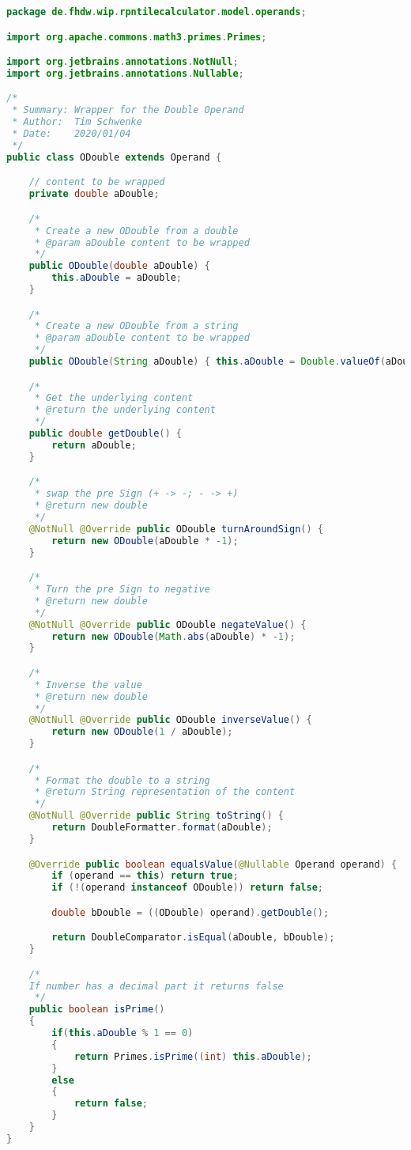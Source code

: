 \begin{lstlisting}[caption=ODouble (Schwenke),label=list:ODouble,language=Java]
package de.fhdw.wip.rpntilecalculator.model.operands;

import org.apache.commons.math3.primes.Primes;

import org.jetbrains.annotations.NotNull;
import org.jetbrains.annotations.Nullable;

/*
 * Summary: Wrapper for the Double Operand
 * Author:  Tim Schwenke
 * Date:    2020/01/04
 */
public class ODouble extends Operand {

    // content to be wrapped
    private double aDouble;

    /*
     * Create a new ODouble from a double
     * @param aDouble content to be wrapped
     */
    public ODouble(double aDouble) {
        this.aDouble = aDouble;
    }

    /*
     * Create a new ODouble from a string
     * @param aDouble content to be wrapped
     */
    public ODouble(String aDouble) { this.aDouble = Double.valueOf(aDouble); }

    /*
     * Get the underlying content
     * @return the underlying content
     */
    public double getDouble() {
        return aDouble;
    }

    /*
     * swap the pre Sign (+ -> -; - -> +)
     * @return new double
     */
    @NotNull @Override public ODouble turnAroundSign() {
        return new ODouble(aDouble * -1);
    }

    /*
     * Turn the pre Sign to negative
     * @return new double
     */
    @NotNull @Override public ODouble negateValue() {
        return new ODouble(Math.abs(aDouble) * -1);
    }

    /*
     * Inverse the value
     * @return new double
     */
    @NotNull @Override public ODouble inverseValue() {
        return new ODouble(1 / aDouble);
    }

    /*
     * Format the double to a string
     * @return String representation of the content
     */
    @NotNull @Override public String toString() {
        return DoubleFormatter.format(aDouble);
    }

    @Override public boolean equalsValue(@Nullable Operand operand) {
        if (operand == this) return true;
        if (!(operand instanceof ODouble)) return false;

        double bDouble = ((ODouble) operand).getDouble();

        return DoubleComparator.isEqual(aDouble, bDouble);
    }

    /*
    If number has a decimal part it returns false
     */
    public boolean isPrime()
    {
        if(this.aDouble % 1 == 0)
        {
            return Primes.isPrime((int) this.aDouble);
        }
        else
        {
            return false;
        }
    }
}
\end{lstlisting}    

